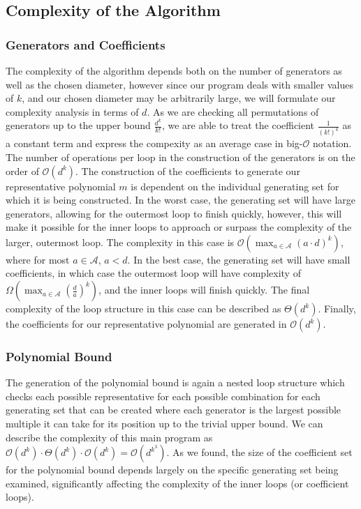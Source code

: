 \subsection{Complexity of the Algorithm}

\subsubsection{Generators and Coefficients}

The complexity of the algorithm depends both on the number of generators as well as the chosen diameter, however since our program deals with smaller values of $k$, and our chosen diameter may be arbitrarily large, we will formulate our complexity analysis in terms of $d$. As we are checking all permutations of generators up to the upper bound $\frac{d^k}{k!}$, we are able to treat the coefficient $\frac{1}{(k!)^{k}}$ as a constant term and express the compexity as an average case in big-$\mathcal{O}$ notation. The number of operations per loop in the construction of the generators is on the order of $\mathcal{O}(d^{k})$. The construction of the coefficients to generate our representative polynomial $m$ is dependent on the individual generating set for which it is being constructed. In the worst case, the generating set will have large generators, allowing for the outermost loop to finish quickly, however, this will make it possible for the inner loops to approach or surpass the complexity of the larger, outermost loop. The complexity in this case is $\mathcal{O}(\max_{a \in \mathscr{A}}(a \cdot d)^k)$, where for most $a \in \mathscr{A}$, $a < d$. In the best case, the generating set will have small coefficients, in which case the outermost loop will have complexity of $\Omega(\max_{a \in \mathscr{A}} (\frac{d}{a})^k)$, and the inner loops will finish quickly. The final complexity of the loop structure in this case can be described as $\Theta(d^k)$. Finally, the coefficients for our representative polynomial are generated in $\mathcal{O}(d^k)$.

\subsubsection{Polynomial Bound}

The generation of the polynomial bound is again a nested loop structure which checks each possible representative for each possible combination for each generating set that can be created where each generator is the largest possible multiple it can take for its position up to the trivial upper bound. We can describe the complexity of this main program as $\mathcal{O}(d^k) \cdot \Theta(d^k) \cdot \mathcal{O}(d^k) = \mathcal{O}(d^{k^3})$. As we found, the size of the coefficient set for the polynomial bound depends largely on the specific generating set being examined, significantly affecting the complexity of the inner loops (or coefficient loops).
